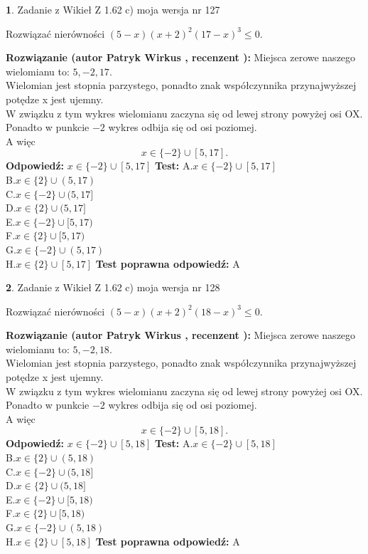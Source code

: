 \documentclass[12pt, a4paper]{article}
\theoremstyle{definition} %
\newtheorem{zad}{}
\newcommand{\zadStart}[1]{\begin{zad}#1\newline}
\newcommand{\zadStop}{\end{zad}}
\newcommand{\rozwStart}[2]{\noindent \textbf{Rozwiązanie (autor #1 , recenzent #2): }\newline}
\newcommand{\rozwStop}{\newline}
\newcommand{\odpStart}{\noindent \textbf{Odpowiedź:}\newline}
\newcommand{\odpStop}{\newline}
\newcommand{\testStart}{\noindent \textbf{Test:}\newline}
\newcommand{\testStop}{\newline}
\newcommand{\kluczStart}{\noindent \textbf{Test poprawna odpowiedź:}\newline}
\newcommand{\kluczStop}{\newline}
\begin{document}
\zadStart{Zadanie z Wikieł Z 1.62 c) moja wersja nr 127}

Rozwiązać nierówności $(5-x)(x+2)^{2}(17-x)^{3}\le0$.
\zadStop
\rozwStart{Patryk Wirkus}{}
Miejsca zerowe naszego wielomianu to: $5, -2, 17$.\\
Wielomian jest stopnia parzystego, ponadto znak współczynnika przy\linebreak najwyższej potędze x jest ujemny.\\ W związku z tym wykres wielomianu zaczyna się od lewej strony powyżej osi OX.\\
Ponadto w punkcie $-2$ wykres odbija się od osi poziomej.\\
A więc $$x \in \{-2\} \cup [5,17].$$
\rozwStop
\odpStart
$x \in \{-2\} \cup [5,17]$
\odpStop
\testStart
A.$x \in \{-2\} \cup [5,17]$\\
B.$x \in \{2\} \cup (5,17)$\\
C.$x \in \{-2\} \cup (5,17]$\\
D.$x \in \{2\} \cup (5,17]$\\
E.$x \in \{-2\} \cup [5,17)$\\
F.$x \in \{2\} \cup [5,17)$\\
G.$x \in \{-2\} \cup (5,17)$\\
H.$x \in \{2\} \cup [5,17]$
\testStop
\kluczStart
A
\kluczStop



\zadStart{Zadanie z Wikieł Z 1.62 c) moja wersja nr 128}

Rozwiązać nierówności $(5-x)(x+2)^{2}(18-x)^{3}\le0$.
\zadStop
\rozwStart{Patryk Wirkus}{}
Miejsca zerowe naszego wielomianu to: $5, -2, 18$.\\
Wielomian jest stopnia parzystego, ponadto znak współczynnika przy\linebreak najwyższej potędze x jest ujemny.\\ W związku z tym wykres wielomianu zaczyna się od lewej strony powyżej osi OX.\\
Ponadto w punkcie $-2$ wykres odbija się od osi poziomej.\\
A więc $$x \in \{-2\} \cup [5,18].$$
\rozwStop
\odpStart
$x \in \{-2\} \cup [5,18]$
\odpStop
\testStart
A.$x \in \{-2\} \cup [5,18]$\\
B.$x \in \{2\} \cup (5,18)$\\
C.$x \in \{-2\} \cup (5,18]$\\
D.$x \in \{2\} \cup (5,18]$\\
E.$x \in \{-2\} \cup [5,18)$\\
F.$x \in \{2\} \cup [5,18)$\\
G.$x \in \{-2\} \cup (5,18)$\\
H.$x \in \{2\} \cup [5,18]$
\testStop
\kluczStart
A
\kluczStop
\end{document}
